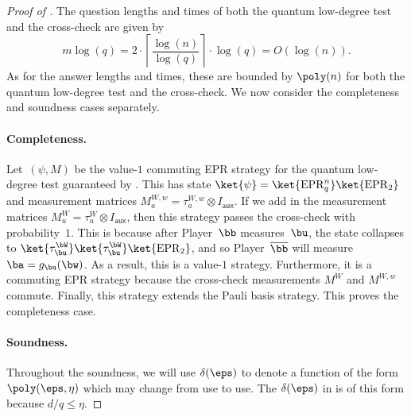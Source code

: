 \documentclass[11pt]{article}
\newcommand{\reg}[1]{{\mathsf{#1}}}
\begin{document}
\begin{proof}[Proof of ]
The question lengths and times of both the quantum low-degree test and the cross-check are given by
\begin{equation*}
m \log(q) = 2\cdot \left\lceil \frac{\log(n)}{\log(q)}\right\rceil  \cdot \log(q) = O(\log(n)).
\end{equation*}
As for the answer lengths and times, these are bounded by $\poly(n)$ for both the quantum low-degree test and the cross-check.
We now consider the completeness and soundness cases separately.
\paragraph{Completeness.}
Let~$(\psi, M)$ be the value-$1$ commuting EPR strategy for the quantum low-degree test guaranteed by .
This has state $\ket{\psi} = \ket{\mathrm{EPR}_q^n} \ket{\mathrm{EPR}_2}$ and measurement matrices $M^{W,w}_a = \tau^{W,w}_a \otimes I_{\reg{aux}}$.
If we add in the measurement matrices $M^W_u = \tau^W_u \otimes I_{\reg{aux}}$,
then this strategy passes the cross-check with probability~$1$.
This is because after Player~$\bb$ measures~$\bu$,
the state collapses to $\ket{\tau^{\bW}_{\bu}}\ket{\tau^{\bW}_{\bu}} \ket{\mathrm{EPR}_2}$,
and so Player~$\overline{\bb}$ will measure $\ba = g_{\bu}(\bw)$.
As a result, this is a value-$1$ strategy.
Furthermore, it is a commuting EPR strategy because the cross-check measurements $M^W$ and $M^{W,w}$ commute.
Finally, this strategy extends the Pauli basis strategy.
This proves the completeness case.

\paragraph{Soundness.}
Throughout the soundness, we will use $\delta(\eps)$ to denote a function of the form $\poly(\eps, \eta)$ which may change from use to use.
The $\delta(\eps)$ in  is of this form because $d/q\leq \eta$.


\end{proof}
\end{document}
